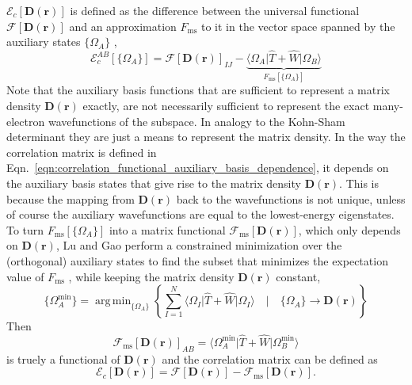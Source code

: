 \documentclass[journal=jacsat,manuscript=article]{achemso}
\DeclareMathOperator*{\argmin}{arg\,min}
\newcommand\m[1]{\mathbf{#1}}
\renewcommand\vec[1]{\mathbf{#1}}
\begin{document}
$\mathcal{E}_{c}[\m{D}(\vec{r})]$ is defined
as the difference between the universal functional $\mathcal{F}[\m{D}(\vec{r})]$ and an approximation $F_{\text{ms}}$ to it in the vector space spanned
by the auxiliary states $\{\Omega_A\}$
\cite[Eqn.~(30)]{Lu2022fundamental},
\begin{equation}
\mathcal{E}^{AB}_c[\{\Omega_A\}] = \mathcal{F}[\m{D}(\vec{r})]_{IJ}
- \underbrace{\langle \Omega_A \vert \hat{T} + \hat{W} \vert \Omega_B \rangle}_{F_{\text{ms}}[\{\Omega_A\}]}
\label{eqn:correlation_functional_auxiliary_basis_dependence}
\end{equation}
Note that the auxiliary basis functions that are sufficient to represent a matrix density $\m{D}(\vec{r})$ exactly, are not necessarily sufficient
to represent the exact many-electron wavefunctions of the subspace. In analogy to the Kohn-Sham determinant they are just a means to represent
the matrix density. In the way the correlation matrix is defined in Eqn.~\ref{eqn:correlation_functional_auxiliary_basis_dependence},
it depends on the auxiliary basis states that give rise to the matrix density $\m{D}(\vec{r})$. This is because the mapping from $\m{D}(\vec{r})$ back to
the wavefunctions is not unique, unless of course the auxiliary wavefunctions are equal to the lowest-energy eigenstates.
To turn $F_{\text{ms}}[\{\Omega_A\}]$
into a matrix functional $\mathcal{F}_{\text{ms}}[\m{D}(\vec{r})]$, which only depends on $\m{D}(\vec{r})$, Lu and Gao \cite{Lu2022fundamental} perform a
constrained minimization over the (orthogonal) auxiliary states to find the subset that minimizes the expectation value of $F_{\text{ms}}$
\cite[Eqn.~(28)]{Lu2022fundamental}, while keeping the matrix density $\m{D}(\vec{r})$ constant,
\begin{equation}
  \{\Omega_A^{\text{min}}\} = \argmin_{\{\Omega_A\}} \left\{ \sum_{I=1}^{N} 
    \langle \Omega_I \vert \hat{T} + \hat{W} \vert \Omega_I \rangle \quad \Big\vert \quad \{\Omega_A\} \to \m{D}(\vec{r}) \right\}
    \label{eqn:constrained_search}
\end{equation}
Then 
\begin{equation}
\mathcal{F}_{\text{ms}}[\m{D}(\vec{r})]_{AB} = \langle \Omega_A^{\text{min}} \vert \hat{T} + \hat{W} \vert \Omega_B^{\text{min}} \rangle
\end{equation}
is truely a functional of $\m{D}(\vec{r})$ and the correlation matrix can be defined as
\begin{equation}
 \mathcal{E}_{c}[\m{D}(\vec{r})] = \mathcal{F}[\m{D}(\vec{r})] - \mathcal{F}_{\text{ms}}[\m{D}(\vec{r})].
 \label{eqn:correlation_functional_matrix_functional}
\end{equation}
\end{document}
